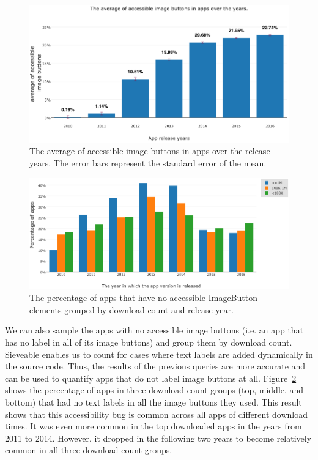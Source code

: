 \begin{figure}[H]
	\includegraphics[scale=0.52]{./figures/findings/accessibility_accessible_image_btns_over_years.png}
	\caption{The average of accessible image buttons in apps over the release years. The error bars represent the standard error of the mean.}
	\label{fig:img_btn_coverage_by_years}
\end{figure}
\begin{figure}[h]
	\includegraphics[scale=0.50]{figures/findings/accessibility_inaccessible_image_btns_by_year_and_download.png}
	\caption{The percentage of apps that have no accessible ImageButton elements grouped by download count and release year.}
	\label{fig:img_btn_no_coverage_by_years}
\end{figure}
We can also sample the apps with no accessible image buttons (i.e. an app that has no label in all of its image buttons) and group them by download count.
Sieveable enables us to count for cases where text labels are added dynamically in the source code.
Thus, the results of the previous queries are more accurate and can be used to quantify apps that do not label image buttons at all.
Figure~\ref{fig:img_btn_no_coverage_by_years} shows the percentage of apps in three download count groups (top, middle, and bottom) that had no text labels in all the image buttons they used.
This result shows that this accessibility bug is common across all apps of different download times.
It was even more common in the top downloaded apps in the years from 2011 to 2014.
However, it dropped in the following two years to become relatively common in all three download count groups.

